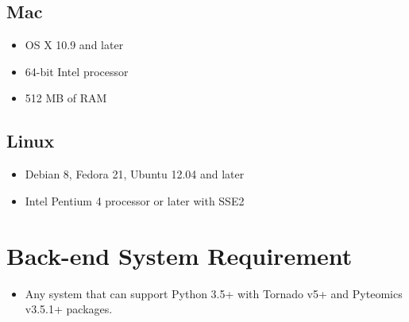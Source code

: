 \documentclass[../manual.tex]{subfiles}
\begin{document}
\subsection{Mac}
\begin{itemize}
	\item OS X 10.9 and later
	\item 64-bit Intel processor
	\item 512 MB of RAM
\end{itemize}
\subsection{Linux}
\begin{itemize}
	\item Debian 8, Fedora 21, Ubuntu 12.04 and later
	\item Intel Pentium 4 processor or later with SSE2
\end{itemize}
\section{Back-end System Requirement}
\begin{itemize}
	\item Any system that can support Python 3.5+ with Tornado v5+ and Pyteomics v3.5.1+ packages.
\end{itemize}
\end{document}
